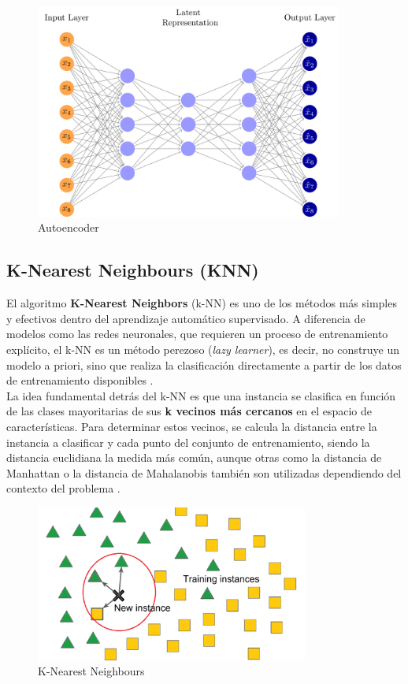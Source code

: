 \documentclass[12pt]{article} %
\begin{document}
\begin{figure}[!ht]
    \centering
    \includegraphics[width=0.9\textwidth]{autoencoder.png}
    \caption{Autoencoder\cite{janosh_autoencoder}}
    \label{fig:autoencoder}
\end{figure}

\subsection{K-Nearest Neighbours (KNN)}
El algoritmo \textbf{K-Nearest Neighbors} (k-NN) es uno de los métodos más simples y efectivos dentro del aprendizaje automático supervisado. A diferencia de modelos como las redes neuronales, que requieren un proceso de entrenamiento explícito, el k-NN es un método perezoso (\textit{lazy learner}), es decir, no construye un modelo a priori, sino que realiza la clasificación directamente a partir de los datos de entrenamiento disponibles \cite{cover1967nearest}. \\

La idea fundamental detrás del k-NN es que una instancia se clasifica en función de las clases mayoritarias de sus \textbf{k vecinos más cercanos} en el espacio de características. Para determinar estos vecinos, se calcula la distancia entre la instancia a clasificar y cada punto del conjunto de entrenamiento, siendo la distancia euclidiana la medida más común, aunque otras como la distancia de Manhattan o la distancia de Mahalanobis también son utilizadas dependiendo del contexto del problema \cite{chomboon2015empirical}. \\

\begin{figure}[!ht]
    \centering
    \includegraphics[width=0.8\textwidth]{knn.png}
    \caption{K-Nearest Neighbours \cite{mlarchive_knn}}
    \label{fig:knn}
\end{figure}
\end{document}
